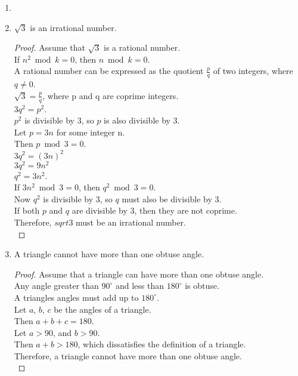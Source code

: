 \begin{enumerate}[leftmargin=2cm,labelsep=.5cm,label=\bf\arabic*.]
\item

\item
\begin{lemma}
$\sqrt{3}$ is an irrational number.
\end{lemma}
\begin{proof}
Assume that $\sqrt{3}$ is a rational number.\\
If $n^2 \bmod k = 0$, then $n \bmod k = 0$.\\
A rational number can be expressed as the quotient $\frac{p}{q}$ of two integers, where $q\neq 0$.\\[2mm]
$\sqrt{3}=\frac{p}{q}$, where p and q are coprime integers.\\
$3q^2 = p^2$.\\
$p^2$ is divisible by $3$, so $p$ is also divisible by $3$.\\
Let $p=3n$ for some integer n.\\
Then $p \bmod 3 = 0$.\\
$3q^2 = (3n)^2$\\
$3q^2 = 9n^2$\\
$q^2 = 3n^2$.\\
If $3n^2 \bmod 3 = 0$, then $q^2 \bmod 3 = 0$.\\[2mm]
Now $q^2$ is divisible by $3$, so $q$ must also be divisible by $3$.\\
If both $p$ and $q$ are divisible by $3$, then they are not coprime.\\
Therefore, $sqrt{3}$ must be an irrational number.\\[5mm]
\end{proof}

\item
\begin{lemma}
A triangle cannot have more than one obtuse angle.
\end{lemma}
\begin{proof}
Assume that a triangle can have more than one obtuse angle.\\
Any angle greater than $90^{\circ}$ and less than $180^{\circ}$ is obtuse.\\
A triangles angles must add up to $180^{\circ}$.\\[2mm]
Let $a$, $b$, $c$ be the angles of a triangle.\\
Then $a + b + c = 180$.\\
Let $a > 90$, and $b > 90$.\\[2mm]
Then $a + b > 180$, which dissatisfies the definition of a triangle.\\
Therefore, a triangle cannot have more than one obtuse angle.\\[5mm]
\end{proof}
\newpage


\end{enumerate}
